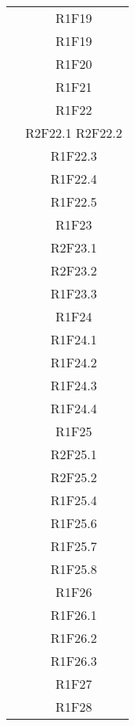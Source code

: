\begin{center}
\begin{longtable}{|c|c|}
	 & R1F19 \\
	 & R1F19 \\
	 & R1F20 \\
	 & R1F21 \\
	 & R1F22 \\
	 & R2F22.1 R2F22.2 \\
	 & R1F22.3 \\
	 & R1F22.4 \\
	 & R1F22.5 \\
	 & R1F23 \\
	 & R2F23.1 \\
	 & R2F23.2 \\
	 & R1F23.3 \\
	 & R1F24 \\
	 & R1F24.1 \\
	 & R1F24.2 \\
	 & R1F24.3 \\
	 & R1F24.4 \\
	 & R1F25 \\
	 & R2F25.1 \\
	 & R2F25.2 \\
	 & R1F25.4 \\
	 & R1F25.6 \\
	 & R1F25.7 \\
	 & R1F25.8 \\
	 & R1F26 \\
	 & R1F26.1 \\
	 & R1F26.2 \\
	 & R1F26.3  \\
	 & R1F27 \\
	 & R1F28 \\
	\hline

	\end{longtable}
\end{center}



